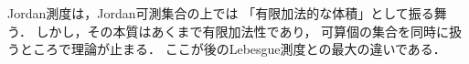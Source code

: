 
\begin{remark}
Jordan測度は，Jordan可測集合の上では
「有限加法的な体積」として振る舞う．
しかし，その本質はあくまで有限加法性であり，
可算個の集合を同時に扱うところで理論が止まる．
ここが後のLebesgue測度との最大の違いである．
\end{remark}



